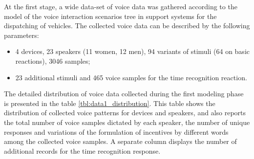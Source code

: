At the first stage, a wide data-set of voice data was gathered according to the model of the voice interaction scenarios tree in support systems for the dispatching of vehicles. The collected voice data can be described by the following parameters:

\begin{itemize}
	\item 4 devices, 23 speakers (11 women, 12 men), 94 variants of stimuli (64 on basic reactions), 3046 samples;
	\item 23 additional stimuli and 465 voice samples for the time recognition reaction.
\end{itemize}

The detailed distribution of voice data collected during the first modeling phase is presented in the table \ref{tbl:data1_distribution}. This table shows the distribution of collected voice patterns for devices and speakers, and also reports the total number of voice samples dictated by each speaker, the number of unique responses and variations of the formulation of incentives by different words among the collected voice samples. A separate column displays the number of additional records for the time recognition response.

